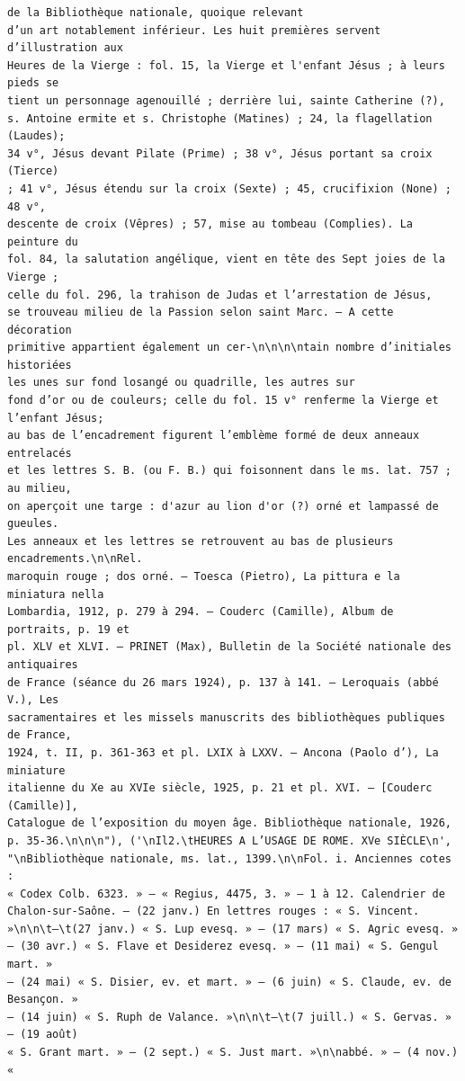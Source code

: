 \documentclass[a4paper,12pt,twoside]{book}
\begin{document}
\begin{verbatim}
de la Bibliothèque nationale, quoique relevant
d’un art notablement inférieur. Les huit premières servent d’illustration aux 
Heures de la Vierge : fol. 15, la Vierge et l'enfant Jésus ; à leurs pieds se 
tient un personnage agenouillé ; derrière lui, sainte Catherine (?), 
s. Antoine ermite et s. Christophe (Matines) ; 24, la flagellation (Laudes);
34 v°, Jésus devant Pilate (Prime) ; 38 v°, Jésus portant sa croix (Tierce) 
; 41 v°, Jésus étendu sur la croix (Sexte) ; 45, crucifixion (None) ; 48 v°,
descente de croix (Vêpres) ; 57, mise au tombeau (Complies). La peinture du
fol. 84, la salutation angélique, vient en tête des Sept joies de la Vierge ; 
celle du fol. 296, la trahison de Judas et l’arrestation de Jésus, 
se trouveau milieu de la Passion selon saint Marc. — A cette décoration 
primitive appartient également un cer-\n\n\n\ntain nombre d’initiales historiées
les unes sur fond losangé ou quadrille, les autres sur 
fond d’or ou de couleurs; celle du fol. 15 v° renferme la Vierge et l’enfant Jésus;
au bas de l’encadrement figurent l’emblème formé de deux anneaux entrelacés 
et les lettres S. B. (ou F. B.) qui foisonnent dans le ms. lat. 757 ; au milieu,
on aperçoit une targe : d'azur au lion d'or (?) orné et lampassé de gueules. 
Les anneaux et les lettres se retrouvent au bas de plusieurs encadrements.\n\nRel. 
maroquin rouge ; dos orné. — Toesca (Pietro), La pittura e la miniatura nella 
Lombardia, 1912, p. 279 à 294. — Couderc (Camille), Album de portraits, p. 19 et 
pl. XLV et XLVI. — PRINET (Max), Bulletin de la Société nationale des antiquaires
de France (séance du 26 mars 1924), p. 137 à 141. — Leroquais (abbé V.), Les 
sacramentaires et les missels manuscrits des bibliothèques publiques de France,
1924, t. II, p. 361-363 et pl. LXIX à LXXV. — Ancona (Paolo d’), La miniature 
italienne du Xe au XVIe siècle, 1925, p. 21 et pl. XVI. — [Couderc (Camille)], 
Catalogue de l’exposition du moyen âge. Bibliothèque nationale, 1926,
p. 35-36.\n\n\n"), ('\nIl2.\tHEURES A L’USAGE DE ROME. XVe SIÈCLE\n', 
"\nBibliothèque nationale, ms. lat., 1399.\n\nFol. i. Anciennes cotes :
« Codex Colb. 6323. » — « Regius, 4475, 3. » — 1 à 12. Calendrier de 
Chalon-sur-Saône. — (22 janv.) En lettres rouges : « S. Vincent. 
»\n\n\t—\t(27 janv.) « S. Lup evesq. » — (17 mars) « S. Agric evesq. »
— (30 avr.) « S. Flave et Desiderez evesq. » — (11 mai) « S. Gengul mart. »
— (24 mai) « S. Disier, ev. et mart. » — (6 juin) « S. Claude, ev. de Besançon. »
— (14 juin) « S. Ruph de Valance. »\n\n\t—\t(7 juill.) « S. Gervas. » — (19 août) 
« S. Grant mart. » — (2 sept.) « S. Just mart. »\n\nabbé. » — (4 nov.) « 

\end{verbatim}
\end{document}
